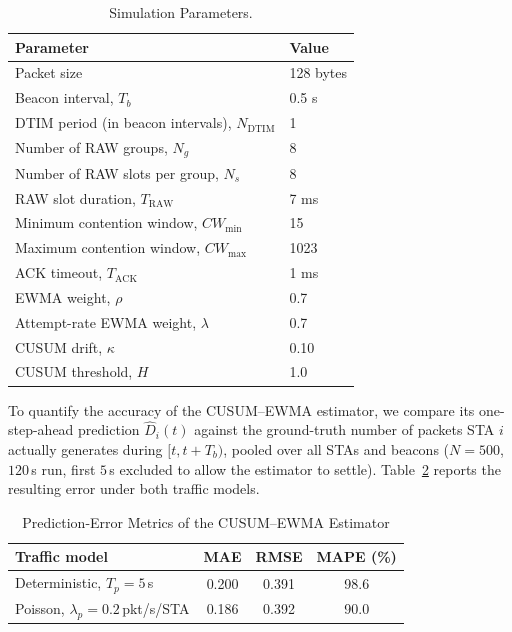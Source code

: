 \documentclass[journal]{IEEEtran}
\newcommand{\rev}[1]{{\color{blue}#1}}
\newcommand{\new}[1]{{\color{red}#1}}
\begin{document}
\begin{table}[!t]
\centering
\caption{Simulation \rev{Parameters}.}
\label{tab:sim_settings}
\renewcommand{\arraystretch}{1.15}
\begin{tabular}{|l|l|}
\hline
\textbf{Parameter} & \textbf{Value} \\ \hline
Packet size & 128 bytes \\
Beacon interval, $T_b$ & 0.5 s \\
DTIM period (in beacon intervals), $N_{\mathrm{DTIM}}$ & 1 \\
Number of RAW groups, $N_g$ & 8 \\
Number of RAW slots per group, $N_s$ & 8 \\
RAW slot duration, $T_{\mathrm{RAW}}$ & 7 ms \\
Minimum contention window, $CW_{\min}$ & 15 \\
Maximum contention window, $CW_{\max}$ & 1023 \\
ACK timeout, $T_{\mathrm{ACK}}$ & 1 ms \\
\rev{EWMA weight, $\rho$} & \new{0.7} \\
\rev{Attempt-rate EWMA weight, $\lambda$} & \new{0.7} \\
\rev{CUSUM drift, $\kappa$} & \new{0.10} \\
\rev{CUSUM threshold, $H$} & \new{1.0} \\ \hline
\end{tabular}
\end{table}

To quantify the accuracy of the CUSUM--EWMA estimator, we compare its
one-step-ahead prediction $\hat{D}_{i}(t)$ against the ground-truth number
of packets STA $i$ actually generates during $[t,t+T_b)$, pooled over all
STAs and beacons ($N=500$, $120$\,s run, first $5$\,s excluded to allow
the estimator to settle). Table~\ref{tab:pred_error} reports the
resulting error under both traffic models.

\begin{table}[t]
\centering
\caption{Prediction-Error Metrics of the CUSUM--EWMA Estimator}
\label{tab:pred_error}
\begin{tabular}{lccc}
\toprule
Traffic model & MAE & RMSE & MAPE (\%) \\
\midrule
Deterministic, $T_p=5$\,s            & 0.200 & 0.391 & 98.6 \\
Poisson, $\lambda_p=0.2$\,pkt/s/STA  & 0.186 & 0.392 & 90.0 \\
\bottomrule
\end{tabular}
\end{table}
\end{document}
